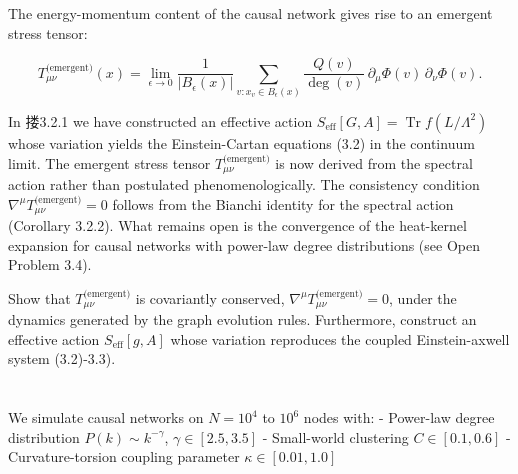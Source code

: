 \documentclass[11pt,a4paper]{article}
\theoremstyle{plain}
\theoremstyle{definition}
\begin{document}
\subsubsection{\1}

The energy-momentum content of the causal network gives rise to an emergent stress tensor:

\[T^{\text{(emergent)}}_{\mu\nu}(x) = \lim_{\epsilon \to 0} \frac{1}{|B_\epsilon(x)|} \sum_{v: x_v \in B_\epsilon(x)} \frac{Q(v)}{\deg(v)} \, \partial_\mu \Phi(v) \, \partial_\nu \Phi(v).\]

\textbf{\1} In 搂3.2.1 we have constructed an effective action $S_{\text{eff}}[G, A] = \operatorname{Tr} f(L/\Lambda^2)$ whose variation yields the Einstein-Cartan equations (3.2) in the continuum limit. The emergent stress tensor $T^{\text{(emergent)}}_{\mu\nu}$ is now derived from the spectral action rather than postulated phenomenologically. The consistency condition $\nabla^\mu T^{\text{(emergent)}}_{\mu\nu} = 0$ follows from the Bianchi identity for the spectral action (Corollary 3.2.2). What remains open is the convergence of the heat-kernel expansion for causal networks with power-law degree distributions (see Open Problem 3.4).

\textbf{\1} Show that $T^{\text{(emergent)}}_{\mu\nu}$ is covariantly conserved, $\nabla^\mu T^{\text{(emergent)}}_{\mu\nu} = 0$, under the dynamics generated by the graph evolution rules. Furthermore, construct an effective action $S_{\text{eff}}[g, A]$ whose variation reproduces the coupled Einstein-axwell system (3.2)-3.3).

\textemdash{}

\section{\1}

\subsection{\1}

We simulate causal networks on $N = 10^4$ to $10^6$ nodes with:
- Power-law degree distribution $P(k) \sim k^{-\gamma}$, $\gamma \in [2.5, 3.5]$
- Small-world clustering $C \in [0.1, 0.6]$
- Curvature-torsion coupling parameter $\kappa \in [0.01, 1.0]$

\subsection{\1}
\end{document}
